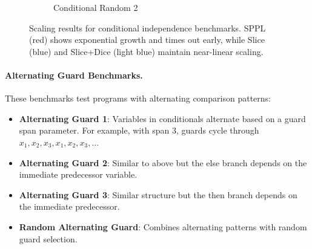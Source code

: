 \begin{figure}[!t]
\begin{subfigure}{0.32\textwidth}
\caption{Conditional Random 2}
\end{subfigure}
\caption{Scaling results for conditional independence benchmarks. SPPL (red) shows exponential growth and times out early, while Slice (blue) and Slice+Dice (light blue) maintain near-linear scaling.}
\label{fig:cond-benchmarks}
\end{figure}

\paragraph{Alternating Guard Benchmarks.}
These benchmarks test programs with alternating comparison patterns:
\begin{itemize}
\item \textbf{Alternating Guard 1}: Variables in conditionals alternate based on a guard span parameter. For example, with span 3, guards cycle through $x_1, x_2, x_3, x_1, x_2, x_3, ...$
\item \textbf{Alternating Guard 2}: Similar to above but the else branch depends on the immediate predecessor variable.
\item \textbf{Alternating Guard 3}: Similar structure but the then branch depends on the immediate predecessor.
\item \textbf{Random Alternating Guard}: Combines alternating patterns with random guard selection.
\end{itemize}

